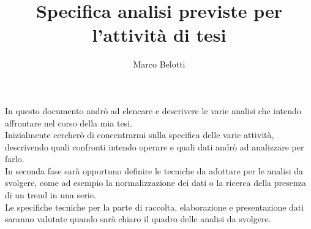 \documentclass{article}
\title{Specifica analisi previste per l'attività di tesi}
\author{Marco Belotti}
\begin{document}
\maketitle

In questo documento andrò ad elencare e descrivere le varie analisi che intendo affrontare nel corso della mia tesi. 
\\Inizialmente cercherò di concentrarmi sulla specifica delle varie attività, descrivendo quali confronti intendo operare e quali dati andrò ad analizzare per farlo.
\\In seconda fase sarà opportuno definire le tecniche da adottare per le analisi da svolgere, come ad esempio la normalizzazione dei dati o la ricerca della presenza di un trend in una serie.
\\Le specifiche tecniche per la parte di raccolta, elaborazione e presentazione dati saranno valutate quando sarà chiaro il quadro delle analisi da svolgere.
\newpage
\end{document}
